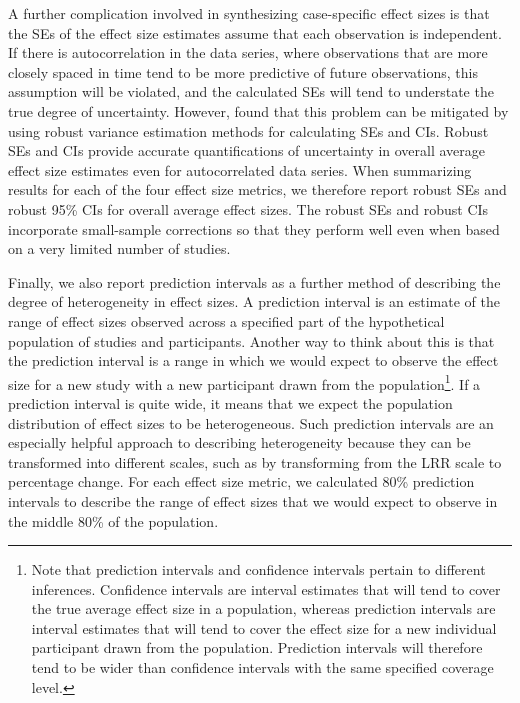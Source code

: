 \documentclass[
]{book}
\begin{document}
A further complication involved in synthesizing case-specific effect sizes is that the SEs of the effect size estimates assume that each observation is independent. If there is autocorrelation in the data series, where observations that are more closely spaced in time tend to be more predictive of future observations, this assumption will be violated, and the calculated SEs will tend to understate the true degree of uncertainty. However, \citet{Chen_Pustejovsky_2022} found that this problem can be mitigated by using robust variance estimation methods for calculating SEs and CIs. Robust SEs and CIs provide accurate quantifications of uncertainty in overall average effect size estimates even for autocorrelated data series. When summarizing results for each of the four effect size metrics, we therefore report robust SEs and robust 95\% CIs for overall average effect sizes. The robust SEs and robust CIs incorporate small-sample corrections \citep{Tipton_2015, Tipton_Pustejovsky_2015} so that they perform well even when based on a very limited number of studies.

Finally, we also report prediction intervals as a further method of describing the degree of heterogeneity in effect sizes. A prediction interval is an estimate of the range of effect sizes observed across a specified part of the hypothetical population of studies and participants. Another way to think about this is that the prediction interval is a range in which we would expect to observe the effect size for a new study with a new participant drawn from the population\footnote{Note that prediction intervals and confidence intervals pertain to different inferences. Confidence intervals are interval estimates that will tend to cover the true average effect size in a population, whereas prediction intervals are interval estimates that will tend to cover the effect size for a new individual participant drawn from the population. Prediction intervals will therefore tend to be wider than confidence intervals with the same specified coverage level.}. If a prediction interval is quite wide, it means that we expect the population distribution of effect sizes to be heterogeneous. Such prediction intervals are an especially helpful approach to describing heterogeneity because they can be transformed into different scales, such as by transforming from the LRR scale to percentage change. For each effect size metric, we calculated 80\% prediction intervals to describe the range of effect sizes that we would expect to observe in the middle 80\% of the population.
\end{document}
